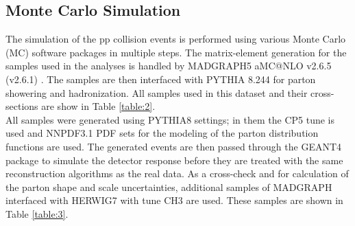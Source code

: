 \subsection{Monte Carlo Simulation}\label{MC}
The simulation of the pp collision events is performed using various Monte Carlo (MC) software packages in multiple steps. The matrix-element generation for the samples used in the analyses is handled by MADGRAPH5 aMC@NLO v2.6.5 (v2.6.1) \cite{madgraph}. The samples are then interfaced with PYTHIA 8.244 \cite{pythia8} for parton showering and hadronization. All samples used in this dataset and their cross-sections are show in Table \ref{table:2}.\\
All samples were generated using PYTHIA8 settings; in them the CP5 tune \cite{CP5} is used and NNPDF3.1 \cite{nnpdf} PDF sets for the modeling of the parton distribution functions are used. The generated events are then passed through the GEANT4 \cite{geant4} package to simulate the detector response before they are treated with the same reconstruction algorithms as the real data. As a cross-check and for calculation of the parton shape and scale uncertainties, additional samples of MADGRAPH interfaced with HERWIG7 \cite{herwig}  with tune CH3 are used. These samples are shown in Table \ref{table:3}.\\
\begin{table}[h!]
	\centering
	\caption{Madgraph MLM + Pythia8 datasets and cross sections.
}\label{table:2}
\end{table}
